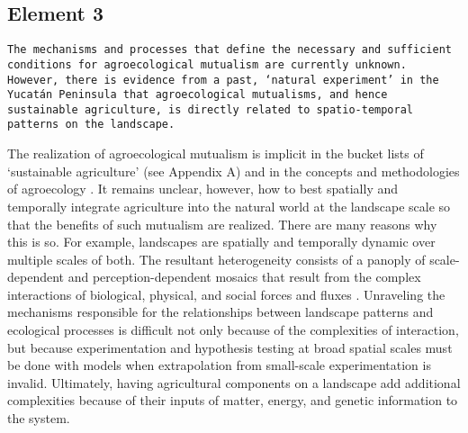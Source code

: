 \subsection{Element 3}
\begin{sloppypar}
\noindent \texttt{The mechanisms and processes that define the necessary and sufficient conditions for agroecological mutualism are currently unknown. However, there is evidence from a past, \enquote*{natural experiment} in the Yucat\'{a}n Peninsula that agroecological mutualisms, and hence sustainable agriculture, is directly related to spatio-temporal patterns on the landscape. }\\
\end{sloppypar}

The realization of agroecological mutualism is implicit in the bucket lists of \enquote*{sustainable agriculture} (see Appendix A) and in the concepts and methodologies of agroecology \citep{gliessman_agroecology:_2015}. It remains unclear, however, how to best spatially and temporally integrate agriculture into the natural world at the landscape scale so that the benefits of such mutualism are realized. There are many reasons why this is so. For example, landscapes are spatially and temporally dynamic over multiple scales of both. The resultant heterogeneity consists of a panoply of scale-dependent and perception-dependent mosaics that result from the complex interactions of biological, physical, and social forces and fluxes \citep{turner_landscape_1989}. Unraveling the mechanisms responsible for the relationships between landscape patterns and ecological processes is difficult not only because of the complexities of interaction, but because experimentation and hypothesis testing at broad spatial scales must be done with models when extrapolation from small-scale experimentation is invalid. Ultimately, having agricultural components on a landscape add additional complexities because of their inputs of matter, energy, and genetic information to the system. \\

